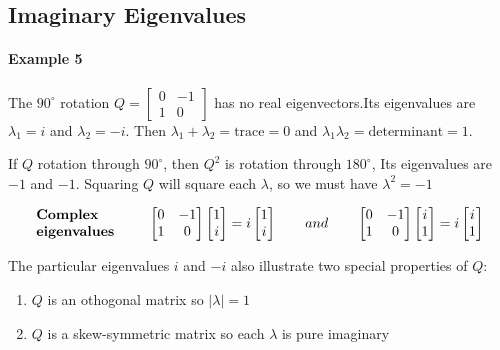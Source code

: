 \documentclass{article}
\begin{document}
\subsection{Imaginary Eigenvalues}

\paragraph{Example 5}
The  $90^{\circ}$ rotation $Q = \begin{bmatrix} 0 & -1 \\ 1 & 0 \end{bmatrix}$ has no real eigenvectors.Its eigenvalues are $\lambda_1 = i$ and $\lambda_2 = -i$. Then $\lambda_1 + \lambda_2 = \text{trace} = 0$ and $\lambda_1 \lambda_2 = \text{determinant} = 1$.

If $Q$ rotation through $90^{\circ}$, then $Q^2$ is rotation through $180^{\circ}$, Its eigenvalues are $-1$ and $-1$. Squaring $Q$ will square each $\lambda$, so we must have $\lambda^2 = -1$

\[
	\parbox{8em}{\textbf{Complex\\ eigenvalues}}
	\begin{bmatrix}
		0 & -1 \\
		1 & 0
	\end{bmatrix}
	\begin{bmatrix}
		1 \\
		i
	\end{bmatrix}
	= i
	\begin{bmatrix}
		1 \\
		i
	\end{bmatrix}
	\qquad and \qquad
	\begin{bmatrix}
		0 & -1 \\
		1 & 0
	\end{bmatrix}
	\begin{bmatrix}
		i \\
		1
	\end{bmatrix}
	= i
	\begin{bmatrix}
		i \\
		1
	\end{bmatrix}
\]

The particular eigenvalues $i$ and $-i$ also illustrate two special properties of $Q$:

\begin{enumerate}
	\item $Q$ is an othogonal matrix so $|\lambda| = 1$
	\item $Q$ is a skew-symmetric matrix so each $\lambda$ is pure imaginary
\end{enumerate}
\end{document}
